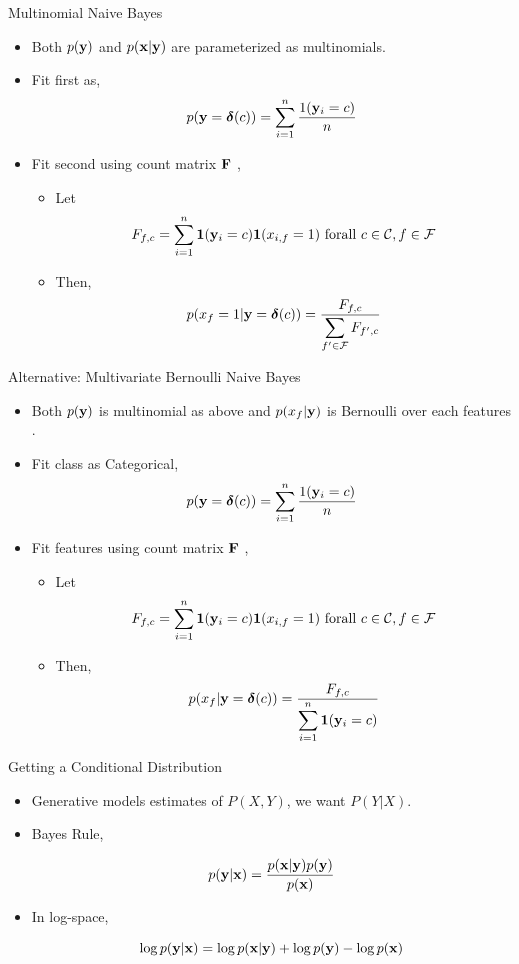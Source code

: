 \documentclass{beamer}
\begin{document}
\begin{frame}{Multinomial Naive Bayes}
  \begin{itemize}
  \item  Both  $p(\mathbf{y})$ and $p(\mathbf{x} | \mathbf{y})$ are
    parameterized as multinomials.
    
  \item Fit first as,
    \[p(\mathbf{y} = \boldsymbol{\delta}(c)) = \sum_{i = 1}^n \frac{1(\mathbf{y}_i = c)}{n}\]
    \pause

  \item Fit second using count matrix $\mathbf{F}$ ,
    \begin{itemize}
      \item Let \[F_{f,c} = \sum_{i = 1}^n \mathbf{1}(\mathbf{y}_i = c) \mathbf{1}(x_{i, f} = 1) \mathrm{\ for all\ } c\in \mathcal{C}, f\in \mathcal{F}\] 
      \item Then,
      \[p(x_f = 1 | \mathbf{y}=\boldsymbol{\delta}(c)) = \frac{F_{f, c}}{\displaystyle \sum_{f' \in \mathcal{F}} F_{f',c}}  \]     
    \end{itemize}
  \end{itemize}
\end{frame}


\begin{frame}{Alternative:  Multivariate Bernoulli Naive Bayes}
  \begin{itemize}
  \item  Both  $p(\mathbf{y})$ is multinomial as above 
    and $p(x_f | \mathbf{y})$ is Bernoulli over each features .
   
  \item Fit class as Categorical,
    \[p(\mathbf{y} = \boldsymbol{\delta}(c)) = \sum_{i = 1}^n \frac{1(\mathbf{y}_i = c)}{n}\]
    \pause
    
  \item Fit features using count matrix $\mathbf{F}$ ,
    \begin{itemize}
      \item Let \[F_{f,c} = \sum_{i = 1}^n \mathbf{1}(\mathbf{y}_i = c) \mathbf{1}(x_{i, f} = 1) \mathrm{\ for all\ } c\in \mathcal{C}, f\in \mathcal{F}\] 
      \item Then,
      \[p(x_f | \mathbf{y}=\boldsymbol{\delta}(c)) = \frac{F_{f, c}}{\displaystyle \sum_{i = 1}^n \mathbf{1}(\mathbf{y}_i = c)}  \]     
    \end{itemize}
  \end{itemize}
\end{frame}


\begin{frame}{Getting a Conditional Distribution}
  \begin{itemize}
  \item Generative models estimates of $P(X, Y)$, we want $P(Y | X)$. 
  \item
  Bayes Rule,

  \[  p(\mathbf{y} | \mathbf{x}) = \frac{ p(\mathbf{x} | \mathbf{y})  p(\mathbf{y})}{ p(\mathbf{x})}  \] 
  
\item  In log-space,

  \[ \log p(\mathbf{y} | \mathbf{x}) = \log p(\mathbf{x}| \mathbf{y}) + \log p(\mathbf{y}) - \log p(\mathbf{x})  \] 
  \end{itemize}
  
\end{frame}
\end{document}

